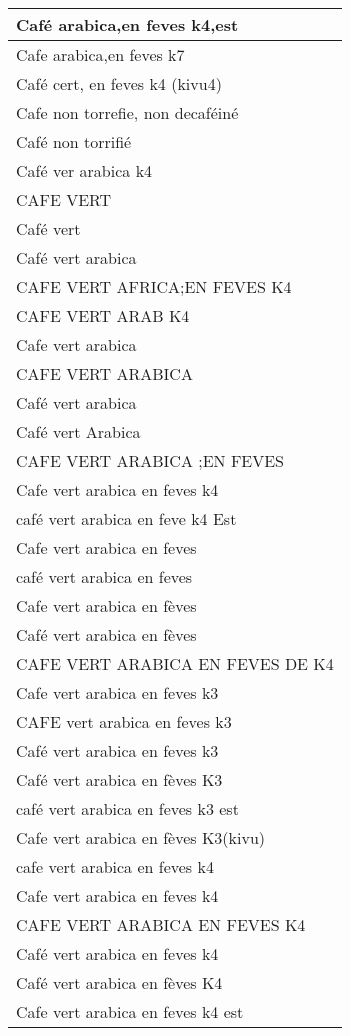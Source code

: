 \documentclass[
]{book}
\begin{document}
\begin{table}
\begin{tabular}[t]{l}
Café arabica,en feves k4,est\\
\hline
Cafe arabica,en feves k7\\
\hline
Café cert, en feves k4 (kivu4)\\
\hline
Cafe non torrefie, non decaféiné\\
\hline
Café non torrifié\\
\hline
Café ver arabica k4\\
\hline
CAFE VERT\\
\hline
Café vert\\
\hline
Café vert  arabica\\
\hline
CAFE VERT AFRICA;EN FEVES K4\\
\hline
CAFE VERT ARAB K4\\
\hline
Cafe vert arabica\\
\hline
CAFE VERT ARABICA\\
\hline
Café vert arabica\\
\hline
Café vert Arabica\\
\hline
CAFE VERT ARABICA ;EN FEVES\\
\hline
Cafe vert arabica en  feves k4\\
\hline
café vert arabica en feve k4 Est\\
\hline
Cafe vert arabica en feves\\
\hline
café vert arabica en feves\\
\hline
Cafe vert arabica en fèves\\
\hline
Café vert arabica en fèves\\
\hline
CAFE VERT ARABICA EN FEVES DE K4\\
\hline
Cafe vert arabica en feves k3\\
\hline
CAFE vert arabica en feves k3\\
\hline
Café vert arabica en feves k3\\
\hline
Café vert arabica en fèves K3\\
\hline
café vert arabica en feves k3 est\\
\hline
Cafe vert arabica en fèves K3(kivu)\\
\hline
cafe vert arabica en feves k4\\
\hline
Cafe vert arabica en feves k4\\
\hline
CAFE VERT ARABICA EN FEVES K4\\
\hline
Café vert arabica en feves k4\\
\hline
Café vert arabica en fèves K4\\
\hline
Cafe vert arabica en feves k4 est\\

\end{tabular}
\end{table}
\end{document}
